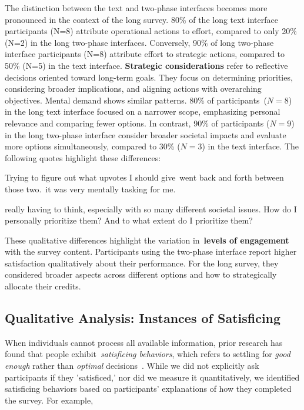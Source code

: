 The distinction between the text and two-phase interfaces becomes more pronounced in the context of the long survey. 80\% of the long text interface participants (N=8) attribute operational actions to effort, compared to only 20\% (N=2) in the long two-phase interfaces. Conversely, 90\% of long two-phase interface participants (N=8) attribute effort to strategic actions, compared to 50\% (N=5) in the text interface. \textbf{Strategic considerations} refer to reflective decisions oriented toward long-term goals. They focus on determining priorities, considering broader implications, and aligning actions with overarching objectives. Mental demand shows similar patterns. 80\% of participants~($N=8$) in the long text interface focused on a narrower scope, emphasizing personal relevance and comparing fewer options. In contrast, 90\% of participants ($N=9$) in the long two-phase interface consider broader societal impacts and evaluate more options simultaneously, compared to 30\% ($N=3$) in the text interface. The following quotes highlight these differences:

\begin{displayquote}
Trying to figure out what upvotes I should give~\bracketellipsis went back and forth between those two.~\bracketellipsis it was very mentally tasking for me. \hfill{}
\end{displayquote}

\begin{displayquote}
\bracketellipsis really having to think, especially with so many different societal issues. How do I personally prioritize them? And to what extent do I prioritize them? \hfill{}
\end{displayquote}

These qualitative differences highlight the variation in~\textbf{levels of engagement} with the survey content. Participants using the two-phase interface report higher satisfaction qualitatively about their performance. For the long survey, they considered broader aspects across different options and how to strategically allocate their credits. 

\subsection{Qualitative Analysis: Instances of Satisficing}
\label{sec:satisficing}
When individuals cannot process all available information, prior research has found that people exhibit~\textit{satisficing behaviors}, which refers to settling for \textit{good enough} rather than \textit{optimal} decisions~\cite{gigerenzerReasoningFastFrugal1996}. While we did not explicitly ask participants if they 'satisficed,' nor did we measure it quantitatively, we identified satisficing behaviors based on participants' explanations of how they completed the survey. For example, 

